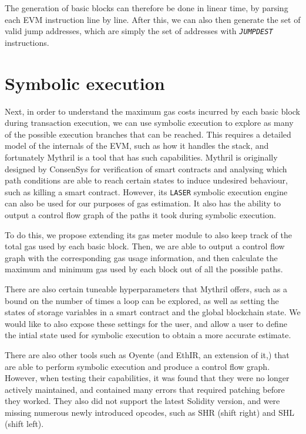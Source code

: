 The generation of basic blocks can therefore be done in linear time, by parsing each
EVM instruction line by line. After this, we can also then generate the set of valid jump addresses,
which are simply the set of addresses with \textit{\texttt{JUMPDEST}} instructions.

\section{Symbolic execution}

Next, in order to understand the maximum gas costs incurred by each basic block during transaction
execution, we can use symbolic execution to explore as many of the possible execution branches that
can be reached. This requires a detailed model of the internals of the EVM, such as how it
handles the stack, and fortunately Mythril is a tool that has such capabilities. Mythril \cite{mythril} is originally
designed by ConsenSys for verification of smart contracts and analysing which path conditions are able to
reach certain states to induce undesired behaviour, such as killing a smart contract. However, its \texttt{LASER} symbolic
execution engine can also be used for our purposes of gas estimation. It also has the ability to output a control flow graph
of the paths it took during symbolic execution. 

To do this, we propose extending its gas meter module to also keep track of the total gas used by each basic block. Then,
we are able to output a control flow graph with the corresponding gas usage information, and then calculate the maximum 
and minimum gas used by each block out of all the possible paths.

There are also certain tuneable hyperparameters that Mythril offers, such as a bound on the number of times a loop can be explored,
as well as setting the states of storage variables in a smart contract and the global blockchain state. We would like to also expose
these settings for the user, and allow a user to define the intial state used for symbolic execution to obtain a more accurate
estimate.

There are also other tools such as Oyente \cite{oyente} (and EthIR, an extension of it,) that are able to perform symbolic execution and produce a 
control flow graph. However, when testing their capabilities, it was found that they were no longer actively maintained,
and contained many errors that required patching before they worked. They also did not support the latest Solidity version, and were
missing numerous newly introduced opcodes, such as SHR (shift right) and SHL (shift left).

